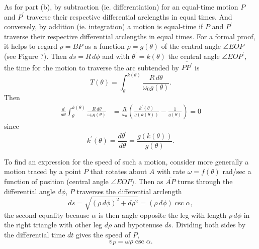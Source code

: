 \documentclass{ximera}
\begin{document}
As for part (b), by subtraction (ie. differentiation) for an equal-time motion $P$ and $P^\prime$ traverse their respective differential arclengths in equal times. And conversely, by addition (ie. integration) a motion is equal-time if $P$ and $P^\prime$ traverse their respective differential arclengths in equal times. For a formal proof, it helps to regard $\rho = BP$ as a function $\rho = g(\theta)$ of the central angle $\angle EOP$ (see Figure ?). Then $ds = R \, d\phi$ and with $\theta^\prime = k(\theta)$ the central angle $\angle EOP^\prime$, the time for the motion to traverse the arc subtended by $\overline{PP^\prime}$ is
\[
  T(\theta) =  \int_\theta^{k(\theta)} \frac{R\, d\theta}{\omega_0 g(\theta)}.
\]
Then
\begin{align*}
  \frac{d}{d\theta} \int_\theta^{k(\theta)} \frac{R\, d\theta}{\omega_0 g(\theta)} &= \frac{R}{\omega_0}\left(   \frac{k^\prime(\theta)}{g(k(\theta))} - \frac{1}{g(\theta)}        \right) = 0
\end{align*}
since
\[
   k^\prime(\theta) = \frac{d\theta^\prime}{d\theta} = \frac{g(k(\theta))}{g(\theta)}.
\]



To find an expression for the speed of such a motion, consider more generally a motion traced by a point $P$ that rotates about $A$ with rate $\omega = f(\theta)$ rad/sec a function of position (central angle $\angle EOP$). Then as $\overline{AP}$ turns through the differential angle $d\phi$, $P$ traverses the differential arclength
\[
   ds =  \sqrt{(\rho \, d\phi)^2 + d\rho^2}   =   (\rho \, d\phi) \csc \alpha ,
\]
the second equality because $\alpha$ is then angle opposite the leg with length $\rho \, d\phi$ in the right triangle with other leg $d\rho$ and hypotenuse $ds$. Dividing both sides by the differential time $dt$ gives the speed of $P$,
\[
     v_P  = \omega \rho \csc \alpha .
\]





\end{document}
